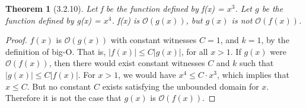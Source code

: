 \documentclass[a4paper, 12pt]{article}
\theoremstyle{plain}
\newtheorem*{theorem*}{Theorem}
\begin{document}
	
	\begin{theorem*}[3.2.10]
		Let f be the function defined by f(x) = $x^3$. Let $g$ be the function defined by g(x) = $x^{4}$. f(x) is $\mathcal{O}(g(x))$, but $g(x)$ is not $\mathcal{O}(f(x))$.
	\end{theorem*}
	
	\begin{proof}
		$f(x)$ is $\mathcal{O}(g(x))$ with constant witnesses $C = 1$, and $k = 1$, by the definition of big-O. That is, $|f(x)| \le C|g(x)|$, for all $x > 1$. \newline \indent If $g(x)$ were $\mathcal{O}(f(x))$, then there would exist constant witnesses $C$ and $k$ such that $|g(x)| \le C|f(x)|$. For $x > 1$, we would have $x^{4} \le C \cdot x^{3}$, which implies that $x \le C$. But no constant $C$ exists satisfying the unbounded domain for $x$. Therefore it is not the case that $g(x)$ is $\mathcal{O}(f(x))$.
	\end{proof}
\end{document}
